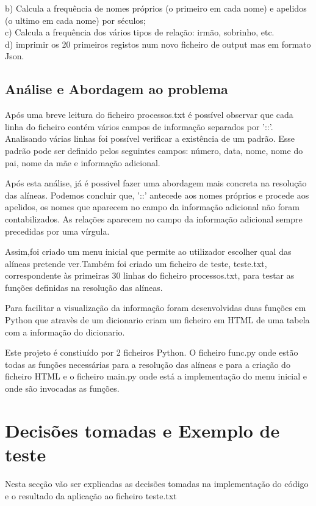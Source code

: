 \documentclass[a4paper, 12pt]{article}
\begin{document}
b) Calcula a frequência de nomes próprios (o primeiro em cada nome) e apelidos (o ultimo em cada nome) por séculos;\\

c) Calcula a frequência dos vários tipos de relação: irmão, sobrinho, etc.\\

d) imprimir os 20 primeiros registos num novo ficheiro de output mas em formato Json.
\newpage
\subsection{Análise e Abordagem ao problema}
Após uma breve leitura do ficheiro processos.txt é possível observar que cada linha do ficheiro contém vários campos de informação separados por '::'.
Analisando várias linhas foi possível verificar a existência de um padrão. Esse padrão pode ser definido pelos seguintes campos: número, data, nome, nome do pai, nome da mãe e informação adicional. 

Após esta análise, já é possivel fazer uma abordagem mais concreta na resolução das alíneas. Podemos concluir que,  '::' antecede aos nomes próprios e procede aos apelidos, os nomes que aparecem no campo da informação adicional não foram contabilizados. As relações aparecem no campo da informação adicional sempre precedidas por uma vírgula. 

Assim,foi criado um menu inicial que permite ao utilizador escolher qual das alíneas pretende ver.Também foi criado um ficheiro de teste, teste.txt, correspondente às primeiras 30 linhas do ficheiro processos.txt, para testar as funções definidas na resolução das alíneas.  

Para facilitar a visualização da informação foram desenvolvidas duas funções em Python que atravès de um dicionario criam um ficheiro em HTML de uma tabela com a informação do dicionario.

Este projeto é constiuído por 2 ficheiros Python. O ficheiro func.py onde estão todas as funções necessárias para a resolução das alíneas e para a criação do ficheiro HTML e o ficheiro main.py onde está a implementação do menu inicial e onde são invocadas as funções.
\newpage
\section{Decisões tomadas e Exemplo de teste}
Nesta secção vão ser explicadas as decisões tomadas na implementação do código e o resultado da aplicação ao ficheiro teste.txt
\end{document}

